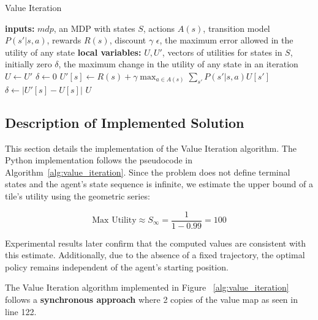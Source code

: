 \begin{algorithm}
\caption{Value Iteration}
\label{alg:value_iteration}
\begin{algorithmic}[1]
        \State \textbf{inputs:} $mdp$, an MDP with states $S$, actions $A(s)$, transition model $P(s'|s, a)$,
        \State \hspace{1.6cm} rewards $R(s)$, discount $\gamma$
        \State \hspace{1.6cm} $\epsilon$, the maximum error allowed in the utility of any state
        \State \textbf{local variables:} $U, U'$, vectors of utilities for states in $S$, initially zero
        \State \hspace{1.6cm} $\delta$, the maximum change in the utility of any state in an iteration
        \Statex
        \Repeat
            \State $U \gets U'$
            \State $\delta \gets 0$
                \State $U'[s] \gets R(s) + \gamma \max_{a \in A(s)} \sum_{s'} P(s'|s, a) U[s']$
                    \State $\delta \gets |U'[s] - U[s]|$
                \EndIf
            \EndFor
        \State \Return $U$
    \EndFunction
\end{algorithmic}
\end{algorithm}

\subsection{Description of Implemented Solution}
This section details the implementation of the Value Iteration algorithm. The Python implementation follows the pseudocode in Algorithm~\ref{alg:value_iteration}. Since the problem does not define terminal states and the agent’s state sequence is infinite, we estimate the upper bound of a tile’s utility using the geometric series:

\begin{equation}
    \text{Max Utility} \approx S_{\infty} = \frac{1}{1 - 0.99} = 100
\end{equation}

\noindent Experimental results later confirm that the computed values are consistent with this estimate. Additionally, due to the absence of a fixed trajectory, the optimal policy remains independent of the agent’s starting position. \vspace{10pt}

\noindent The Value Iteration algorithm implemented in Figure ~\ref{alg:value_iteration} follows a \textbf{synchronous approach} where 2 copies of the value map as seen in line 122. \vspace{10pt}

